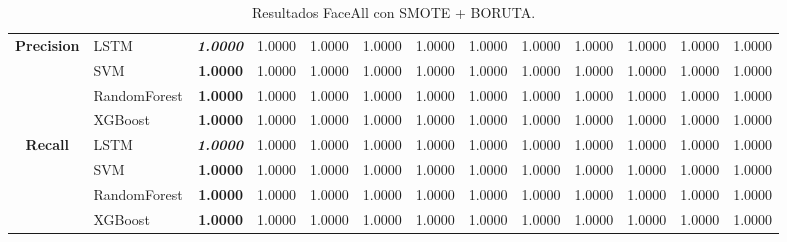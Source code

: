 \begin{table}[H]
\begin{adjustbox}{max width=12cm}
\begin{tabular}{|c|l|r|r|r|r|r|r|r|r|r|r|r|}
			\textbf{Precision} & LSTM &  \textit{\textbf{1.0000}} &  1.0000 &  1.0000 &  1.0000 &  1.0000 &  1.0000 &  1.0000 &  1.0000 &  1.0000 &  1.0000 &  1.0000 \\
			& SVM & \textbf{1.0000} &  1.0000 &  1.0000 &  1.0000 &  1.0000 &  1.0000 &  1.0000 &  1.0000 &  1.0000 &  1.0000 &  1.0000 \\
			& RandomForest &  \textbf{1.0000} &  1.0000 &  1.0000 &  1.0000 &  1.0000 &  1.0000 &  1.0000 &  1.0000 &  1.0000 &  1.0000 &  1.0000 \\
			& XGBoost &  \textbf{1.0000} &  1.0000 &  1.0000 &  1.0000 &  1.0000 &  1.0000 &  1.0000 &  1.0000 &  1.0000 &  1.0000 &  1.0000 \\
			\hline
			\textbf{Recall} & LSTM &  \textit{\textbf{1.0000}} &  1.0000 &  1.0000 &  1.0000 &  1.0000 &  1.0000 &  1.0000 &  1.0000 &  1.0000 &  1.0000 &  1.0000 \\
			& SVM &  \textbf{1.0000} &  1.0000 &  1.0000 &  1.0000 &  1.0000 &  1.0000 &  1.0000 &  1.0000 &  1.0000 &  1.0000 &  1.0000 \\
			& RandomForest &  \textbf{1.0000} &  1.0000 &  1.0000 &  1.0000 &  1.0000 &  1.0000 &  1.0000 &  1.0000 &  1.0000 &  1.0000 &  1.0000 \\
			& XGBoost &  \textbf{1.0000} &  1.0000 &  1.0000 &  1.0000 &  1.0000 &  1.0000 &  1.0000 &  1.0000 &  1.0000 &  1.0000 &  1.0000 \\
			\hline
			
		\end{tabular}
	\end{adjustbox}
	\caption{Resultados FaceAll con SMOTE + BORUTA.}
	\label{tab:faceAllSMOTEBORUTA}
\end{table}

